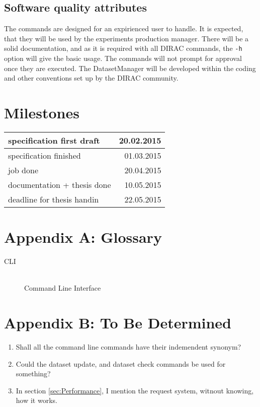 \documentclass{scrreprt}
\begin{document}
\section{Software quality attributes}
The commands are designed for an expirienced user to handle. It is expected, that they will be used by the experiments production manager. There will be a solid documentation, and as it is required with all DIRAC commands, the \texttt{-h} option will give the basic usage. The commands will not prompt for approval once they are executed. The DatasetManager will be developed within the coding and other conventions set up by the DIRAC community.



\chapter{Milestones}

\begin{tabularx}{\textwidth}{ X r }
\hline
specification first draft & 20.02.2015 \\
\hline
specification finished & 01.03.2015 \\
\hline
job done & 20.04.2015 \\
\hline
documentation + thesis done & 10.05.2015\\
\hline
deadline for thesis handin & 22.05.2015 \\
\hline
\end{tabularx}


\newpage
\appendix
\chapter*{Appendix A: Glossary} \label{app:AppendixA}
\begin{description}
\item[CLI] \hfill \\
Command Line Interface
\end{description}

\newpage
\appendix
\chapter*{Appendix B: To Be Determined} \label{app:AppendixB}
\begin{enumerate}
\item Shall all the command line commands have their indemendent synonym?
\item Could the dataset update, and dataset check commands be used for something?
\item In section \ref{sec:Performance}, I mention the request system, witnout knowing, how it works.

\end{enumerate}
\end{document}
